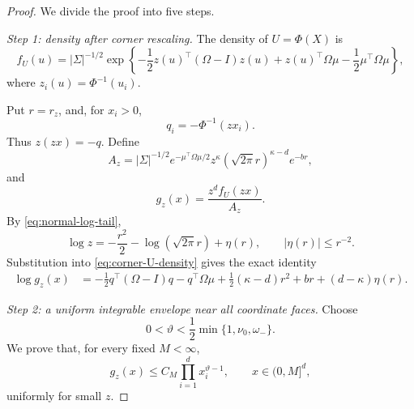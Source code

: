 \begin{proof}
We divide the proof into five steps.

\medskip
\noindent
\emph{Step 1: density after corner rescaling.}
The density of \(U=\Phi(X)\) is
\begin{equation}
 f_U(u)
 =
 |\Sigma|^{-1/2}
 \exp\left\{
 -\frac12z(u)^\top(\Omega-I)z(u)
 +z(u)^\top\Omega\mu
 -\frac12\mu^\top\Omega\mu
 \right\},
 \label{eq:corner-U-density}
\end{equation}
where \(z_i(u)=\Phi^{-1}(u_i)\).

Put \(r=r_z\), and, for \(x_i>0\),
\[
 q_i=-\Phi^{-1}(zx_i).
\]
Thus \(z(zx)=-q\). Define
\begin{equation}
 A_z
 =
 |\Sigma|^{-1/2}
 e^{-\mu^\top\Omega\mu/2}
 z^\kappa
 (\sqrt{2\pi}r)^{\kappa-d}
 e^{-br},
 \label{eq:corner-normalizer}
\end{equation}
and
\[
 g_z(x)=\frac{z^df_U(zx)}{A_z}.
\]
By \eqref{eq:normal-log-tail},
\[
 \log z
 =
 -\frac{r^2}{2}
 -\log(\sqrt{2\pi}r)
 +\eta(r),
 \qquad |\eta(r)|\le r^{-2}.
\]
Substitution into \eqref{eq:corner-U-density} gives the exact
identity
\begin{align}
 \log g_z(x)
 &=
 -\frac12q^\top(\Omega-I)q
 -q^\top\Omega\mu
 +\frac12(\kappa-d)r^2
 +br
 +(d-\kappa)\eta(r).
 \label{eq:corner-log-g}
\end{align}

\medskip
\noindent
\emph{Step 2: a uniform integrable envelope near all coordinate
faces.}
Choose
\begin{equation}
 0<\vartheta<
 \frac12\min\{1,\nu_0,\omega_-\}.
 \label{eq:corner-theta}
\end{equation}
We prove that, for every fixed \(M<\infty\),
\begin{equation}
 g_z(x)\le C_M\prod_{i=1}^dx_i^{\vartheta-1},
 \qquad
 x\in(0,M]^d,
 \label{eq:corner-envelope}
\end{equation}
uniformly for small \(z\).


\end{proof}
